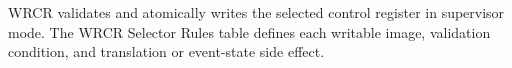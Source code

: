 WRCR validates and atomically writes the selected control register in supervisor mode. The WRCR Selector Rules table defines each writable image, validation condition, and translation or event-state side effect.
